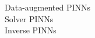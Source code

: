 \documentclass[preview]{standalone}
\begin{document}
Data-augmented PINNs\\Solver PINNs\\Inverse PINNs\\
\end{document}
